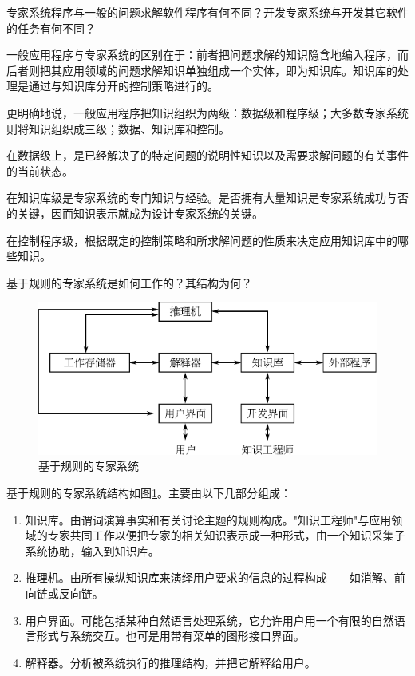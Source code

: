 \begin{question}
专家系统程序与一般的问题求解软件程序有何不同？开发专家系统与开发其它软件的任务有何不同？
\end{question}
\begin{solution}
一般应用程序与专家系统的区别在于：前者把问题求解的知识隐含地编入程序，而后者则把其应用领域的问题求解知识单独组成一个实体，即为知识库。知识库的处理是通过与知识库分开的控制策略进行的。\par
更明确地说，一般应用程序把知识组织为两级：数据级和程序级；大多数专家系统则将知识组织成三级；数据、知识库和控制。\par
在数据级上，是已经解决了的特定问题的说明性知识以及需要求解问题的有关事件的当前状态。\par
在知识库级是专家系统的专门知识与经验。是否拥有大量知识是专家系统成功与否的关键，因而知识表示就成为设计专家系统的关键。\par
在控制程序级，根据既定的控制策略和所求解问题的性质来决定应用知识库中的哪些知识。
\end{solution}

\begin{question}
基于规则的专家系统是如何工作的？其结构为何？
\end{question}
\begin{solution}
	\begin{figure}[h]
		\centering
		\includegraphics{figures/ans-6.6.pdf}
		\caption{基于规则的专家系统} \label{Fig:RES-structure}
	\end{figure}
基于规则的专家系统结构如图\ref{Fig:RES-structure}。主要由以下几部分组成：\par
	\begin{enumerate}
	\item 知识库。由谓词演算事实和有关讨论主题的规则构成。"知识工程师"与应用领域的专家共同工作以便把专家的相关知识表示成一种形式，由一个知识采集子系统协助，输入到知识库。\par
	\item 推理机。由所有操纵知识库来演绎用户要求的信息的过程构成——如消解、前向链或反向链。\par
	\item 用户界面。可能包括某种自然语言处理系统，它允许用户用一个有限的自然语言形式与系统交互。也可是用带有菜单的图形接口界面。\par
	\item 解释器。分析被系统执行的推理结构，并把它解释给用户。
	\end{enumerate}
\end{solution}

